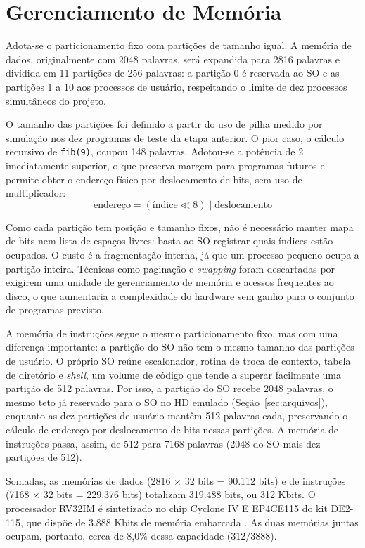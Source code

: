 \documentclass[
	12pt,				%
	openright,			%
	a4paper,			%
	english,			%
	french,				%
	spanish,			%
	brazilian,				%
	]{abntex2}
\begin{document}
\section{Gerenciamento de Memória}
Adota-se o particionamento fixo com partições de tamanho igual. A memória de dados,
originalmente com 2048 palavras, será expandida para 2816 palavras e dividida em 11
partições de 256 palavras: a partição 0 é reservada ao SO e as partições 1 a 10 aos
processos de usuário, respeitando o limite de dez processos simultâneos do projeto.

O tamanho das partições foi definido a partir do uso de pilha medido por simulação
nos dez programas de teste da etapa anterior. O pior caso, o cálculo recursivo de
\texttt{fib(9)}, ocupou 148 palavras. Adotou-se a potência de 2 imediatamente
superior, o que preserva margem para programas futuros e permite obter o endereço
físico por deslocamento de bits, sem uso de multiplicador:
\begin{equation}
  \text{endereço} = (\text{índice} \ll 8) \mid \text{deslocamento}
\end{equation}

Como cada partição tem posição e tamanho fixos, não é necessário manter mapa de bits
nem lista de espaços livres: basta ao SO registrar quais índices estão ocupados. O
custo é a fragmentação interna, já que um processo pequeno ocupa a partição inteira.
Técnicas como paginação e \emph{swapping} foram descartadas por exigirem uma unidade
de gerenciamento de memória e acessos frequentes ao disco, o que aumentaria a
complexidade do hardware sem ganho para o conjunto de programas previsto.

A memória de instruções segue o mesmo particionamento fixo, mas com uma diferença
importante: a partição do SO não tem o mesmo tamanho das partições de usuário. O
próprio SO reúne escalonador, rotina de troca de contexto, tabela de diretório e
\emph{shell}, um volume de código que tende a superar facilmente uma partição de 512
palavras. Por isso, a partição do SO recebe 2048 palavras, o mesmo teto já reservado
para o SO no HD emulado (Seção~\ref{sec:arquivos}), enquanto as dez partições de
usuário mantêm 512 palavras cada, preservando o cálculo de endereço por deslocamento
de bits nessas partições. A memória de instruções passa, assim, de 512 para 7168
palavras (2048 do SO mais dez partições de 512).

Somadas, as memórias de dados (2816 $\times$ 32 bits = 90.112 bits) e de instruções
(7168 $\times$ 32 bits = 229.376 bits) totalizam 319.488 bits, ou 312 Kbits. O
processador RV32IM é sintetizado no chip Cyclone IV E EP4CE115 do kit DE2-115, que
dispõe de 3.888 Kbits de memória embarcada \cite{intelep4ce115}. As duas memórias
juntas ocupam, portanto, cerca de 8,0\% dessa capacidade ($312/3888$).
\end{document}
